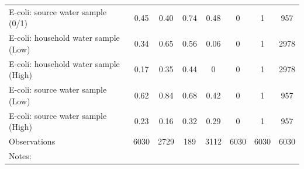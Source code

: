 \begin{table}[htbp]
\begin{tabular}{l*{7}{c}}
E-coli: source water sample (0/1)&        0.45&        0.40&        0.74&        0.48&        0 &        1 &      957 \\
E-coli: household water sample (Low)&        0.34&        0.65&        0.56&        0.06&        0 &        1 &     2978 \\
E-coli: household water sample (High)&        0.17&        0.35&        0.44&        0 &        0 &        1 &     2978 \\
E-coli: source water sample (Low)&        0.62&        0.84&        0.68&        0.42&        0 &        1 &      957 \\
E-coli: source water sample (High)&        0.23&        0.16&        0.32&        0.29&        0 &        1 &      957 \\
\hline
Observations        &        6030&        2729&         189&        3112&        6030&        6030&        6030\\
\hline\hline
\multicolumn{8}{p{0.95\linewidth}}{\scriptsize Notes: }\\
\end{tabular}
\end{table}
